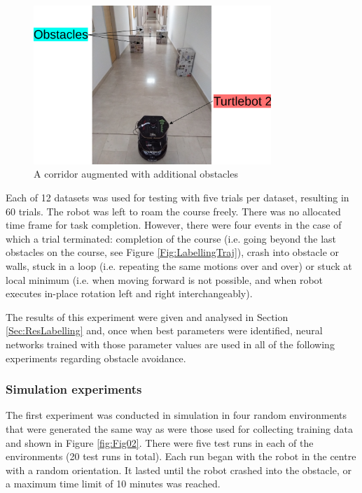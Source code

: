 \begin{figure}
\centering
\includegraphics[width=0.8\textwidth]{slike/hodnik}
\caption{A corridor augmented with additional obstacles}
\label{Fig:Hodnik}
\end{figure}

Each of 12 datasets was used for testing with five trials per dataset, resulting in 60 trials. The robot was left to roam the course freely. There was no allocated time frame for task completion. However, there were four events in the case of which a trial terminated: completion of the course (i.e. going beyond the last obstacles on the course, see Figure \ref{Fig:LabellingTraj}), crash into obstacle or walls, stuck in a loop (i.e. repeating the same motions over and over) or stuck at local minimum (i.e. when moving forward is not possible, and when robot executes in-place rotation left and right interchangeably).

The results of this experiment were given and analysed in Section \ref{Sec:ResLabelling} and, once when best parameters were identified, neural networks trained with those parameter values are used in all of the following experiments regarding obstacle avoidance.

\subsubsection{Simulation experiments}

The first experiment was conducted in simulation in four random environments that were generated the same way as were those used for collecting training data and shown in Figure \ref{fig:Fig02}. There were five test runs in each of the environments (20 test runs in total). Each run began with the robot in the centre with a random orientation. It lasted until the robot crashed into the obstacle, or a maximum time limit of 10 minutes was reached.

